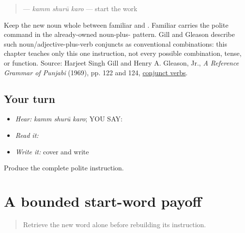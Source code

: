 \begin{grammarlens}[title={Grammar Lens}]
\begin{quote}
\textbf{  } — \emph{kamm shurū karo} — start the work
\end{quote}

Keep the new noun whole between familiar \textbf{} and \textbf{}. Familiar \textbf{} carries the polite command in the already-owned noun-plus-\textbf{} pattern. Gill and Gleason describe such noun/adjective-plus-verb conjuncts as conventional combinations: this chapter teaches only this one instruction, not every possible combination, tense, or function. Source: Harjeet Singh Gill and Henry A. Gleason, Jr., \emph{A Reference Grammar of Punjabi} (1969), pp. 122 and 124, \href{https://pt.learnpunjabi.org/assets/A\%20Reference\%20Grammar\_Final.pdf}{conjunct verbs}.
\end{grammarlens}

\subsection*{Your turn}
\begin{itemize}
\raggedright
  \item \emph{Hear:} \emph{kamm shurū karo}; YOU SAY: \textbf{  }
  \item \emph{Read it:} \textbf{  }
  \item \emph{Write it:} cover and write \textbf{  }
\end{itemize}

\begin{tcolorbox}[breakable,colback=teal!4,colframe=teal!35!black,title={Before you move on}]
Produce the complete polite instruction.
\end{tcolorbox}
\section[\texorpdfstring{\pa{ਕੰਮ} \pa{ਸ਼ੁਰੂ} \pa{ਕਰੋ} (kamm shuruu karo)}{ਕੰਮ ਸ਼ੁਰੂ ਕਰੋ (kamm shuruu karo)}]{A bounded start-word payoff}

\label{lesson:PA-C196-payoff}



\begin{quote}
Retrieve the new word alone before rebuilding its instruction.
\end{quote}

